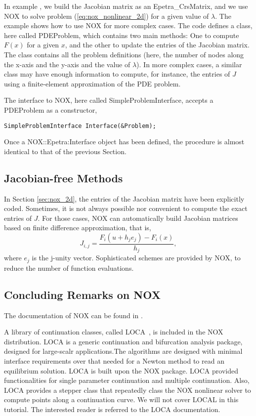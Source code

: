 In example , we build the Jacobian matrix as an
Epetra\_CrsMatrix, and we use NOX to solve problem
(\ref{eq:nox_nonlinear_2d}) for a given value of $\lambda$.  The example
shows how to use NOX for more complex cases. The code defines a class,
here called PDEProblem, which contains two main methods: One to compute
$F(x)$ for a given $x$, and the other to update the entries of the
Jacobian matrix. The class contains all the problem definitions (here,
the number of nodes along the x-axis and the y-axis and the value of
$\lambda$). In more complex cases, a similar class may have enough
information to compute, for instance, the entries of $J$ using a
finite-element approximation of the PDE problem.

The interface to NOX, here called SimpleProblemInterface, accepts a
PDEProblem as a constructor,
\begin{verbatim}
SimpleProblemInterface Interface(&Problem);
\end{verbatim}
Once a NOX::Epetra:Interface object has been defined, the procedure is
almost identical to that of the previous Section.


\subsection{Jacobian-free Methods}
\label{sec:nox_jacobian_free}

In Section \ref{sec:nox_2d}, the entries of the Jacobian matrix have
been explicitly coded. Sometimes, it is not always possible nor
convenient to compute the exact entries of $J$.  For those cases, NOX
can automatically build Jacobian matrices based on finite difference
approximation, that is,
\[
J_{i,j} = \frac{F_i(u + h_j e_j) - F_i(x)}{h_j} ,
\] 
where $e_j$ is the j-unity vector. Sophisticated schemes are provided by
NOX, to reduce the number of function evaluations.


\subsection{Concluding Remarks on NOX}
\label{sec:local}

The documentation of NOX can be found in \cite{NOX-home-page}.

A library of continuation classes, called
LOCA~\cite{LOCA-manual,LOCA-MPSalsa-paper}, is included in the NOX
distribution. LOCA is a generic continuation and bifurcation analysis
package, designed for large-scalr applications.The algorithms are
designed with minimal interface requirements over that needed for a
Newton method to read an equilibrium solution. LOCA is built upon the
NOX package. LOCA provided functionalities for single parameter
continuation and multiple continuation. Also, LOCA provides a stepper
class that repeatedly class the NOX nonlinear solver to compute points
along a continuation curve. We will not cover LOCAL in this tutorial.
The interested reader is referred to the LOCA documentation.

